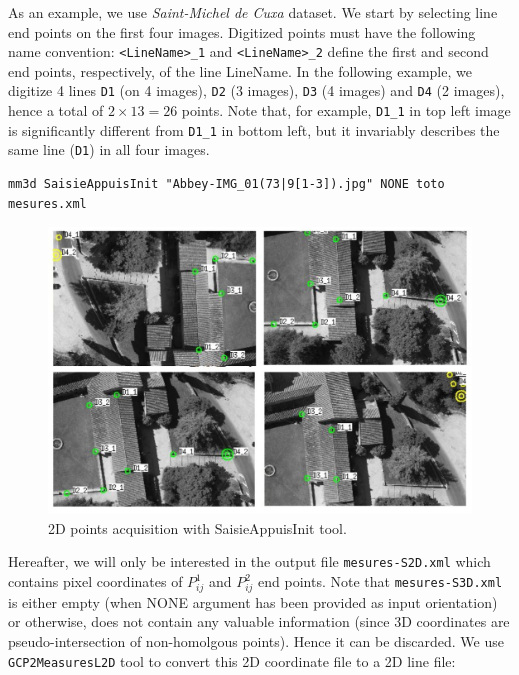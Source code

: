 \noindent As an example, we use \textit{Saint-Michel de Cuxa} dataset. We start by selecting line end points on the first four images. Digitized points must have the following name convention: \texttt{<LineName>\_1} and \texttt{<LineName>\_2} define the first and second end points, respectively, of the line LineName. In the following example, we digitize 4 lines \texttt{D1} (on 4 images), \texttt{D2} (3 images), \texttt{D3} (4 images) and \texttt{D4} (2 images), hence a total of $2 \times 13 = 26$ points. Note that, for example, \texttt{D1\_1} in top left image is significantly different from \texttt{D1\_1} in bottom left, but it invariably describes the same line (\texttt{D1}) in all four images. \newline

\begin{verbatim}
mm3d SaisieAppuisInit "Abbey-IMG_01(73|9[1-3]).jpg" NONE toto mesures.xml
\end{verbatim}

\begin{figure}
	\begin{center}
		\includegraphics[width=120mm]{FIGS/Cuxa/linesSaisieAppuisInit1.pdf}
	\end{center}
	\caption{2D points acquisition with SaisieAppuisInit tool.}
\end{figure}

\noindent Hereafter, we will only be interested in the output file \texttt{mesures-S2D.xml} which contains pixel coordinates of $P_{ij}^1$ and $P_{ij}^2$ end points. Note that \texttt{mesures-S3D.xml} is either empty (when NONE argument has been provided as input orientation) or otherwise, does not contain any valuable information (since 3D coordinates are pseudo-intersection of non-homolgous points). Hence it can be discarded. We use \texttt{GCP2MeasuresL2D} tool to convert this 2D coordinate file to a 2D line file: \newline

